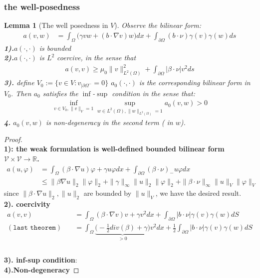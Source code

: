 \documentclass[a4paper,11pt,oneside,fleqn]{book}
\newtheorem{lemma}[theorem]{Lemma}
\theoremstyle{definition}
\theoremstyle{remark}
\begin{document}
\subsubsection*{the well-posedness}
\begin{lemma}[The well posedness in $V$]
Observe the bilinear form:
\begin{align*}
		a(v, w) &= \int_\Omega \bigg(\gamma v w + (b \cdot \nabla v) w \bigg) dx 
		+ \int_{\partial\Omega} (b \cdot  \nu) \gamma(v) \gamma(w) ds
\end{align*}
\textbf{1).}$a(\cdot, \cdot)$ is bounded\\
\textbf{2).}$a(\cdot, \cdot)$ is $L^2$ coercive, in the sense that
\begin{align*}
	a(v, v) \geq \mu_0 \|v\|^2_{L^2(\Omega)} + \int_{\partial \Omega }|\beta \cdot \nu | v^2 ds
\end{align*}
\textbf{3).}
define $V_0 := \{ v \in V:  v_{|\partial \Omega^- } = 0 \}$	
$a_0(\cdot, \cdot)$ is the corresponding bilinear form in $V_0$. Then $a_0$ satisfies the $\inf$-$\sup$ condition in the sense that:
\begin{align*}
	\inf_{v \in V_0, \|v\|_V = 1} \sup_{w \in L^2(\Omega), \|w\|_{L^2(\Omega)} = 1} a_0(v, w) >0
\end{align*}
\textbf{4.}
$a_0(v, w)$ is non-degeneracy in the second term ( in $w$).
\end{lemma}
\begin{proof}
\quad\\
\textbf{1): the weak formulation is well-defined bounded bilinear form $\mathcal{V} \times \mathcal{V} \rightarrow \mathbb{R}$. }
\begin{align*}
	a(u, \varphi) &= \int_\Omega (\beta \cdot  \nabla u) \varphi + \gamma u \varphi dx + \int_{\partial\Omega} (\beta \cdot \nu)_- u\varphi dx \\
	&\le \|\beta \nabla u\|_2\|\varphi\|_2 + \|\gamma\|_\infty \|u\|_2\|\varphi\|_2 + \|\beta \cdot \nu \|_\infty \|u\|_V \|\varphi\|_V
\end{align*}
since $\|\beta \cdot \nabla u\|_2, \|u\|_2$ are bounded by $\|u\|_V$, we have the desired result. \\
\textbf{2). coercivity}
\begin{align*}
	a(v, v) &= \int_\Omega (\beta \cdot \nabla v) v + \gamma v^2 dx + \int_{\partial\Omega} |b \cdot \nu| \gamma(v) \gamma(w)dS \\
	(\texttt{last theorem}) \quad
	&= \int_\Omega \underbrace{ \bigg(-\frac{1}{2} div(\beta) +  \gamma\bigg)}_{> 0 } v^2 dx + \frac{1}{2}\int_{\partial\Omega} |b \cdot \nu| \gamma(v) \gamma(w)dS \\
\end{align*}
\quad\\
\textbf{3). inf-sup condition}:\\
\textbf{4).Non-degeneracy}


\end{proof}
\quad\\
\end{document}
